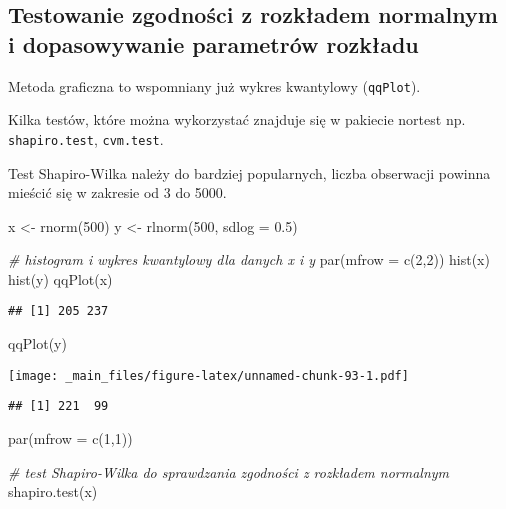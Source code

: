 \documentclass[
]{book}
\newenvironment{Shaded}{\begin{snugshade}}{\end{snugshade}}
\newcommand{\AttributeTok}[1]{\textcolor[rgb]{0.77,0.63,0.00}{#1}}
\newcommand{\CommentTok}[1]{\textcolor[rgb]{0.56,0.35,0.01}{\textit{#1}}}
\newcommand{\DecValTok}[1]{\textcolor[rgb]{0.00,0.00,0.81}{#1}}
\newcommand{\FloatTok}[1]{\textcolor[rgb]{0.00,0.00,0.81}{#1}}
\newcommand{\FunctionTok}[1]{\textcolor[rgb]{0.00,0.00,0.00}{#1}}
\newcommand{\NormalTok}[1]{#1}
\newcommand{\OtherTok}[1]{\textcolor[rgb]{0.56,0.35,0.01}{#1}}
\begin{document}
\hypertarget{testowanie-zgodnoux15bci-z-rozkux142adem-normalnym-i-dopasowywanie-parametruxf3w-rozkux142adu}{%
\subsection{Testowanie zgodności z rozkładem normalnym i dopasowywanie parametrów rozkładu}\label{testowanie-zgodnoux15bci-z-rozkux142adem-normalnym-i-dopasowywanie-parametruxf3w-rozkux142adu}}

Metoda graficzna to wspomniany już wykres kwantylowy (\texttt{qqPlot}).

Kilka testów, które można wykorzystać znajduje się w pakiecie nortest np. \texttt{shapiro.test}, \texttt{cvm.test}.

Test Shapiro-Wilka należy do bardziej popularnych, liczba obserwacji powinna mieścić się w zakresie od 3 do 5000.

\begin{Shaded}
\begin{Highlighting}[]
\NormalTok{x }\OtherTok{\textless{}{-}} \FunctionTok{rnorm}\NormalTok{(}\DecValTok{500}\NormalTok{)}
\NormalTok{y }\OtherTok{\textless{}{-}} \FunctionTok{rlnorm}\NormalTok{(}\DecValTok{500}\NormalTok{, }\AttributeTok{sdlog =} \FloatTok{0.5}\NormalTok{)}

\CommentTok{\# histogram i wykres kwantylowy dla danych x i y}
\FunctionTok{par}\NormalTok{(}\AttributeTok{mfrow =} \FunctionTok{c}\NormalTok{(}\DecValTok{2}\NormalTok{,}\DecValTok{2}\NormalTok{))}
\FunctionTok{hist}\NormalTok{(x)}
\FunctionTok{hist}\NormalTok{(y)}
\FunctionTok{qqPlot}\NormalTok{(x)}
\end{Highlighting}
\end{Shaded}

\begin{verbatim}
## [1] 205 237
\end{verbatim}

\begin{Shaded}
\begin{Highlighting}[]
\FunctionTok{qqPlot}\NormalTok{(y)}
\end{Highlighting}
\end{Shaded}

\texttt{[image: \_main\_files/figure-latex/unnamed-chunk-93-1.pdf]}

\begin{verbatim}
## [1] 221  99
\end{verbatim}

\begin{Shaded}
\begin{Highlighting}[]
\FunctionTok{par}\NormalTok{(}\AttributeTok{mfrow =} \FunctionTok{c}\NormalTok{(}\DecValTok{1}\NormalTok{,}\DecValTok{1}\NormalTok{))}

\CommentTok{\# test Shapiro{-}Wilka do sprawdzania zgodności z rozkładem normalnym}
\FunctionTok{shapiro.test}\NormalTok{(x)}
\end{Highlighting}
\end{Shaded}
\end{document}
